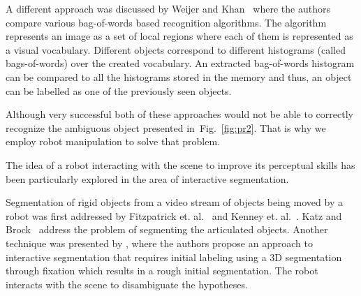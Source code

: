 \documentclass[conference]{IEEEtran}
\newcommand{\figref}[1]{Fig.~\ref{#1}}
\begin{document}
    A different approach was discussed by Weijer and Khan~\cite{van2013fusing} where the authors compare various bag-of-words based recognition algorithms. The algorithm represents an image as a set of local regions where each of them is represented as a visual vocabulary. Different objects correspond to different histograms (called bags-of-words) over the created vocabulary. An extracted bag-of-words histogram can be compared to all the histograms stored in the memory and thus, an object can be labelled as one of the previously seen objects.

    Although very successful both of these approaches would not be able to correctly recognize the ambiguous object presented in~\figref{fig:pr2}. That is why we employ robot manipulation to solve that problem.

    The idea of a robot interacting with the scene to improve its perceptual skills has been particularly explored in the area of interactive segmentation.

    Segmentation of rigid objects from a video stream of objects being moved by a robot was first addressed by Fitzpatrick et. al.~\cite{fitzpatrick_active_vision} and Kenney et. al.~\cite{KenneyInteractive}. Katz and Brock~\cite{Katz-WS-MM-ICRA2011} address the problem of segmenting the articulated objects. Another technique was presented by \cite{bergstrom11icvs}, where the authors propose an approach to interactive segmentation that requires initial labeling using  a 3D segmentation through fixation which results in a rough initial segmentation. The robot interacts with the scene to disambiguate the hypotheses.

    
\end{document}
